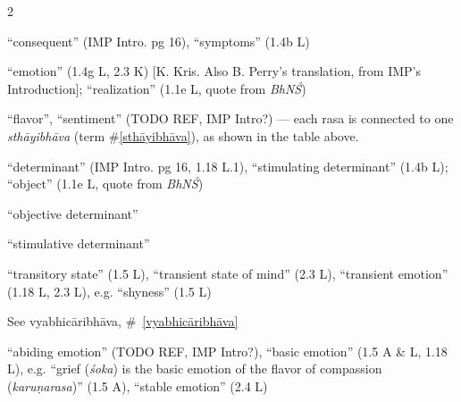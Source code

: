 \documentclass[10pt]{article}
\begin{document}
\begin{multicols}{2}
\begin{enumerate}[
			leftmargin=0em,
			rightmargin=0em,
		]
		 ``consequent'' (IMP Intro. pg 16),
		``symptoms'' (1.4b L)

		 ``emotion'' (1.4g L, 2.3 K) [K. Kris. Also B. Perry's translation, from IMP's Introduction];
		``realization'' (1.1e L, quote from \textit{BhNŚ})

		 ``flavor'', ``sentiment'' (TODO REF, IMP Intro?)
		 --- each rasa is connected to one \textit{sthāyibhāva} (term \#\ref{sthāyibhāva}), as shown in the table above.

		 ``determinant''  (IMP Intro. pg 16, 1.18 L.1),
		``stimulating determinant'' (1.4b L);
		``object'' (1.1e L, quote from \textit{BhNŚ})
		\begin{enumerate}
			 ``objective determinant'' %

			 ``stimulative determinant'' %
		\end{enumerate}

		 ``transitory state'' (1.5 L), 
		``transient state of mind'' (2.3 L), %
		``transient emotion'' (1.18 L, 2.3 L),
		e.g. ``shyness'' (1.5 L)%

		 See vyabhicāribhāva, \#~\ref{vyabhicāribhāva}

		 ``abiding emotion''  (TODO REF, IMP Intro?),
		``basic emotion'' (1.5 A \& L, 1.18 L),
		e.g. ``grief (\textit{śoka}) is the basic emotion of the flavor of compassion (\textit{karuṇarasa})'' (1.5 A), %
		``stable emotion'' (2.4 L)


\end{enumerate}
\end{multicols}
\end{document}
